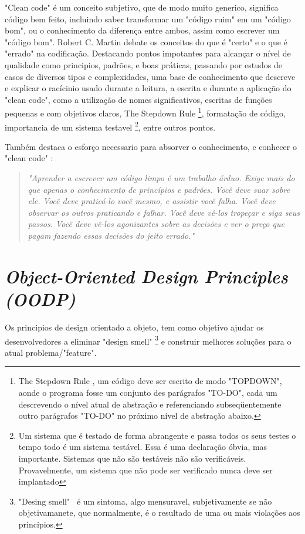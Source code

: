 \documentclass[12pt]{article}
\begin{document}
"Clean code" \cite{ROBERT_MARTIN_CLEAN_CODE} é um conceito subjetivo, que de modo muito generico, significa código bem feito, incluindo saber transformar um "código ruim" em um "código bom", ou o conhecimento da diferença entre ambos, assim como escrever um "código bom". Robert C. Martin \cite{ROBERT_MARTIN_CLEAN_CODE} debate os conceitos do que é "certo" e o que é "errado" na codificação. Destacando pontos impotantes para alcançar o nível de qualidade como principios, padrões, e boas práticas, passando por estudos de casos de diversos tipos e complexidades, uma base de conhecimento que descreve e explicar o racícinio usado durante a leitura, a escrita e durante a aplicação do "clean code", como a utilização de nomes significativos, escritas de funções pequenas e com objetivos claros, The Stepdown Rule \footnote{The Stepdown Rule \cite{ROBERT_MARTIN_CLEAN_CODE}, um código deve ser escrito de modo "TOPDOWN", aonde o programa fosse um conjunto des parágrafos "TO-DO", cada um descrevendo o nível atual de abstração e referenciando subseqüentemente outro parágrafos "TO-DO" no próximo nível de abstração abaixo.}, formatação de código, importancia de um sistema testavel \footnote{Um sistema que é testado de forma abrangente e passa todos os seus testes o tempo todo é um sistema testável. Essa é uma declaração óbvia, mas importante. Sistemas que não são testáveis
não são verificáveis. Provavelmente, um sistema que não pode ser verificado nunca deve ser implantado}, entre outros pontos. 

Também destaca o esforço necessario para absorver o conhecimento, e conhecer o "clean code" \cite{ROBERT_MARTIN_CLEAN_CODE}:

\begin{quotation}
\textit{"Aprender a escrever um código limpo é um trabalho árduo. Exige mais do que apenas o conhecimento de princípios e padrões. Você deve suar sobre ele. Você deve praticá-lo você mesmo, e assistir você falha. Você deve observar os outros praticando e falhar. Você deve vê-los tropeçar e siga seus passos. Você deve vê-los agonizantes sobre as decisões e ver o preço que pagam fazendo essas decisões do jeito errado." }
\end{quotation}

\section{\textit{Object-Oriented Design Principles (OODP)}} \label{sec:oopd}
 
 Os principios de design orientado a objeto, tem como objetivo ajudar os desenvolvedores a eliminar "design smell" \footnote{"Desing smell"\ \cite{ROBERT_MARTIN_AGILE_SW_DEV_PPP} é um sintoma, algo mensuravel, subjetivamente se não objetivamanete, que normalmente, é o resultado de uma ou mais violações aos principios.} e construir melhores soluções para o atual problema/"feature".
\end{document}
